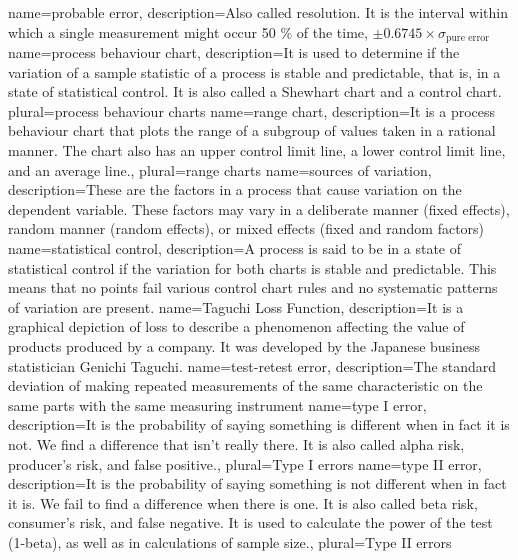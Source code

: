 {
    name={probable error},
    description={Also called resolution. It is the interval within which a single measurement might occur 50 \% of the time, $\pm 0.6745 \times \sigma_\text{pure error}$}
}
{
    name={process behaviour chart},
    description={It is used to determine if the variation of a sample statistic of a process is stable and predictable, that is, in a state of statistical control. It is also called a Shewhart chart and a control chart.}
    plural={process behaviour charts}
}
{
    name={range chart},
    description={It is a process behaviour chart that plots the range of a subgroup of values taken in a rational manner. The chart also has an upper control limit line, a lower control limit line, and an average line.},
    plural={range charts}
}
{
    name={sources of variation},
    description={These are the factors in a process that cause variation on the dependent variable. These factors may vary in a deliberate manner (fixed effects), random manner (random effects), or mixed effects (fixed and random factors)}
}
{
    name={statistical control},
    description={A process is said to be in a state of statistical control if the variation for both charts is stable and predictable. This means that no points fail various control chart rules and no systematic patterns of variation are present.}
}
{
    name={Taguchi Loss Function},
    description={It is a graphical depiction of loss to describe a phenomenon affecting the value of products produced by a company. It was developed by the Japanese business statistician Genichi Taguchi.}
}
{
    name={test-retest error},
    description={The standard deviation of making repeated measurements of the same characteristic on the same parts with the same measuring instrument}
}
{
    name={type I error},
    description={It is the probability of saying something is different when in fact it is not. We find a difference that isn’t really there. It is also called alpha risk, producer's risk, and false positive.},
    plural={Type I errors}
}
{
    name={type II error},
    description={It is the probability of saying something is not different when in fact it is. We fail to find a difference when there is one. It is also called beta risk, consumer’s risk, and false negative. It is used to calculate the power of the test (1-beta), as well as in calculations of sample size.},
    plural={Type II errors}
}
